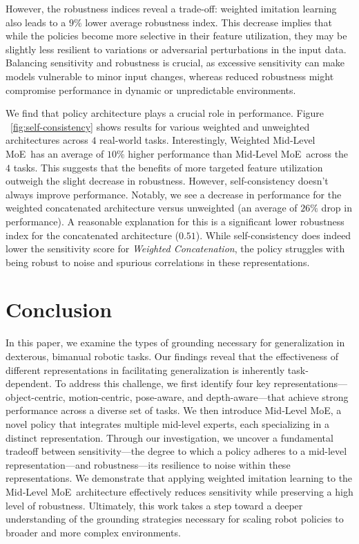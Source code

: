 \documentclass[conference,dvipsnames]{IEEEtran}
\newcommand{\MethodName}{Mid‐Level MoE}
\begin{document}
However, the robustness indices reveal a trade-off: weighted imitation learning also leads to a $9\%$ lower average robustness index. This decrease implies that while the policies become more selective in their feature utilization, they may be slightly less resilient to variations or adversarial perturbations in the input data. Balancing sensitivity and robustness is crucial, as excessive sensitivity can make models vulnerable to minor input changes, whereas reduced robustness might compromise performance in dynamic or unpredictable environments.

We find that policy architecture plays a crucial role in performance. Figure ~\ref{fig:self-consistency} shows results for various weighted and unweighted architectures across $4$ real-world tasks. Interestingly, Weighted \MethodName~has an average of $10\%$ higher performance than \MethodName~across the $4$ tasks.  This suggests that the benefits of more targeted feature utilization outweigh the slight decrease in robustness. However, self-consistency doesn't always improve performance. Notably, we see a decrease in performance for the weighted concatenated architecture versus unweighted (an average of $26\%$ drop in performance). A reasonable explanation for this is a significant lower robustness index for the concatenated architecture ($0.51$). While self-consistency does indeed lower the sensitivity score for \textit{Weighted Concatenation}, the policy struggles with being robust to noise and spurious correlations in these representations. 

\section{Conclusion} 
\label{sec:conclusion}
In this paper, we examine the types of grounding necessary for generalization in dexterous, bimanual robotic tasks. Our findings reveal that the effectiveness of different representations in facilitating generalization is inherently task-dependent. To address this challenge, we first identify four key representations—object-centric, motion-centric, pose-aware, and depth-aware—that achieve strong performance across a diverse set of tasks. We then introduce \MethodName, a novel policy that integrates multiple mid-level experts, each specializing in a distinct representation. Through our investigation, we uncover a fundamental tradeoff between sensitivity—the degree to which a policy adheres to a mid-level representation—and robustness—its resilience to noise within these representations. We demonstrate that applying weighted imitation learning to the \MethodName~architecture effectively reduces sensitivity while preserving a high level of robustness. Ultimately, this work takes a step toward a deeper understanding of the grounding strategies necessary for scaling robot policies to broader and more complex environments.
\end{document}

